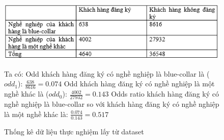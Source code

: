 \documentclass{report}
\newcommand\tab[1][1.25cm]{\hspace*{#1}}
\begin{document}
        \begin{center}
            \begin{figure}[htp]
                \begin{center}
                    \includegraphics[scale = 1]{image/datathucnghiem.PNG}
                \end{center}
                \caption{Thống kê dữ liệu thực nghiệm lấy từ dataset}
                \fontsize{13}{15}\selectfont Ta có:
                    \vspace{0.2cm}\newline\tab[1cm] Odd khách hàng đăng ký có nghề nghiệp là blue-collar là ($odd_1$): $\frac{638}{8616} = 0.074$
                    \vspace{0.2cm}\newline\tab[1cm] Odd khách hàng đăng ký có nghề nghiệp là một nghề khác là ($odd_0$): $\frac{4002}{27932} = 0.143$
                    \vspace{0.2cm}\newline\tab[1cm] Odds ratio khách hàng đăng ký có nghề nghiệp là blue-collar so với khách hàng đăng ký có nghề nghiệp là một nghề khác là: $\frac{0.074}{0.143} = 0.517$\\
            \end{figure}
        \end{center}
        
        \pagebreak
    
\end{document}
